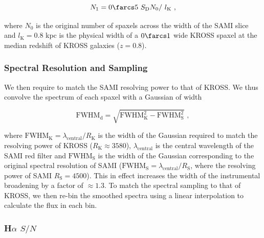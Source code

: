 \documentclass[a4paper,fleqn,usenatbib]{mnras}
\begin{document}
\begin{equation}
N_{\text{1}}=0\farcs 5\ S_{\text{D}} N_{0} /\ l_{\text{K}}\,\,,
\end{equation}

\noindent where $N_{0}$ is the original number of spaxels across the width of the SAMI slice and $l_{\text{K}} = 0.8$ kpc is the physical width of a $0\farcs 1$ wide KROSS spaxel at the median redshift of KROSS galaxies ($z = 0.8$). 

\subsubsection{Spectral Resolution and Sampling}
\label{subsubsec:spectralseeing}

We then require to match the SAMI resolving power to that of KROSS. We thus convolve the spectrum of each spaxel with a Gaussian of width 

\begin{equation}
\text{FWHM}_{\text{d}} = \sqrt{\text{FWHM}_{\text{K}}^{2}-\text{FWHM}_{\text{S}}^{2}}\,\,,
\end{equation}
\label{eq:deltasigspec}
 
\noindent where $\text{FWHM}_{\text{K}} = \lambda_{\text{central}}/R_{\text{K}}$ is the width of the Gaussian required to match the resolving power of KROSS ($R_{\text{K}}\approx3580$), $\lambda_{\text{central}}$ is the central wavelength of the SAMI red filter and $\text{FWHM}_{\text{S}}$ is the width of the Gaussian corresponding to the original spectral resolution of SAMI ($\text{FWHM}_{\text{S}}= \lambda_{\text{central}}/R_{\text{S}}$, where the resolving power of SAMI $R_{\text{S}}=4500$). This in effect increases the width of the instrumental broadening by a factor of $\approx1.3$. To match the spectral sampling to that of KROSS, we then re-bin the smoothed spectra using a linear interpolation to calculate the flux in each bin.

\subsubsection{H$\alpha$ $S/N$}
\label{subsubsec:adjustSN}
\end{document}
